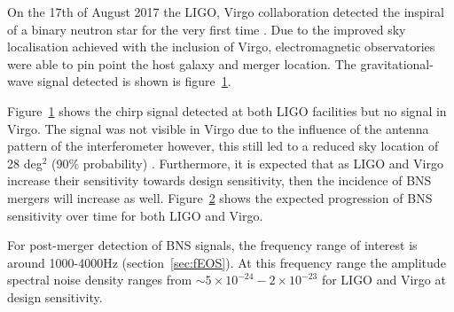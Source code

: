 On the 17th of August 2017 the LIGO, Virgo collaboration detected the inspiral of a binary neutron star for the very first time \citep{GW170817}.  Due to the improved sky localisation achieved with the inclusion of Virgo, electromagnetic observatories were able to pin point the host galaxy and merger location. The gravitational-wave signal detected is shown is figure~\ref{fig:GW170817chirp}.

\begin{figure}[H]
	\begin{center}
		\caption[\protect]{\protect}
		\label{fig:GW170817chirp}
	\end{center}
\end{figure}
Figure~\ref{fig:GW170817chirp} shows the chirp signal detected at both LIGO facilities but no signal in Virgo. The signal was not visible in Virgo due to the influence of the antenna pattern of the interferometer  however, this still led to a reduced sky location of 28 deg$^2$ (90\% probability) \citep{GW170817}. Furthermore, it is expected that as LIGO and Virgo increase their sensitivity towards design sensitivity, then the incidence of BNS mergers will increase as well. Figure~\ref{fig:LIGOBNSsensitivity} shows the expected progression of BNS sensitivity over time for both LIGO and Virgo.
\begin{figure}[H]
	\begin{center}
		\adjincludegraphics[width=15cm,trim={0cm,0cm,0cm,0cm},clip]{./img/LIGOBNSsensitivity}
		\caption[\protect]{\protect}
		\label{fig:LIGOBNSsensitivity}
	\end{center}
\end{figure}
For post-merger detection of BNS signals, the frequency range of interest is around 1000-4000Hz (section~\ref{sec:fEOS}). At this frequency range the amplitude spectral noise density ranges from $\sim 5\times 10^{-24} - 2\times 10^{-23}$ for  LIGO and Virgo at design sensitivity. 



